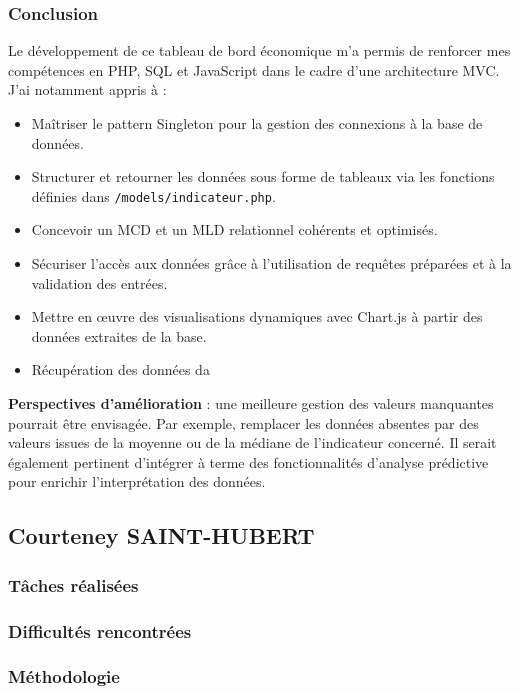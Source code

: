 \documentclass[11pt]{article}
\begin{document}
\subsubsection*{Conclusion}

Le développement de ce tableau de bord économique m’a permis de renforcer mes compétences en PHP, SQL et JavaScript dans le cadre d’une architecture MVC. J’ai notamment appris à :

\begin{itemize}
    \item Maîtriser le pattern Singleton pour la gestion des connexions à la base de données.
    \item Structurer et retourner les données sous forme de tableaux via les fonctions définies dans \texttt{/models/indicateur.php}.
    \item Concevoir un MCD et un MLD relationnel cohérents et optimisés.
    \item Sécuriser l’accès aux données grâce à l’utilisation de requêtes préparées et à la validation des entrées.
    \item Mettre en œuvre des visualisations dynamiques avec Chart.js à partir des données extraites de la base.
    \item  Récupération des données da
\end{itemize}

\textbf{Perspectives d’amélioration} : une meilleure gestion des valeurs manquantes pourrait être envisagée. Par exemple, remplacer les données absentes par des valeurs issues de la moyenne ou de la médiane de l’indicateur concerné. Il serait également pertinent d’intégrer à terme des fonctionnalités d’analyse prédictive pour enrichir l’interprétation des données.

\subsection*{Courteney SAINT-HUBERT}
\subsubsection*{Tâches réalisées}
\subsubsection*{Difficultés rencontrées}
\subsubsection*{Méthodologie}
\end{document}

